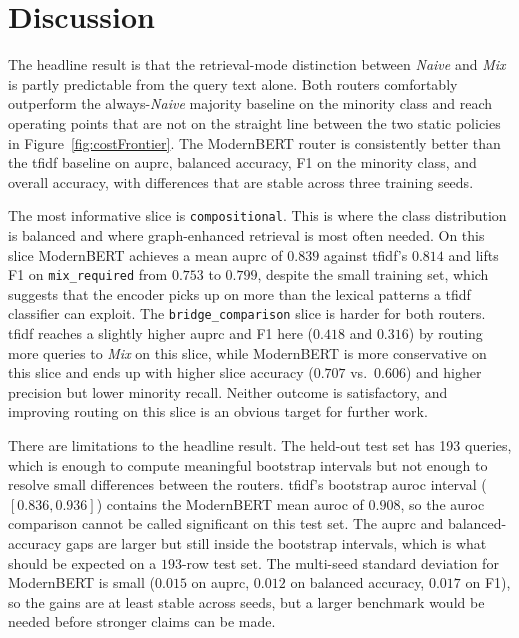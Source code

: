 \documentclass[english, bibtex]{kththesis}               %
\numberwithin{listing}{chapter}
\begin{document}
\section{Discussion}
\label{sec:implDiscussion}

The headline result is that the retrieval-mode distinction between \emph{Naive} and \emph{Mix} is partly predictable from the query text alone. Both routers comfortably outperform the always-\emph{Naive} majority baseline on the minority class and reach operating points that are not on the straight line between the two static policies in Figure~\ref{fig:costFrontier}. The ModernBERT router is consistently better than the \gls{tfidf} baseline on \gls{auprc}, balanced accuracy, F1 on the minority class, and overall accuracy, with differences that are stable across three training seeds.

The most informative slice is \texttt{compositional}. This is where the class distribution is balanced and where graph-enhanced retrieval is most often needed. On this slice ModernBERT achieves a mean \gls{auprc} of $0.839$ against \gls{tfidf}'s $0.814$ and lifts F1 on \texttt{mix\_required} from $0.753$ to $0.799$, despite the small training set, which suggests that the encoder picks up on more than the lexical patterns a \gls{tfidf} classifier can exploit. The \texttt{bridge\_comparison} slice is harder for both routers. \gls{tfidf} reaches a slightly higher \gls{auprc} and F1 here ($0.418$ and $0.316$) by routing more queries to \emph{Mix} on this slice, while ModernBERT is more conservative on this slice and ends up with higher slice accuracy ($0.707$ vs.\ $0.606$) and higher precision but lower minority recall. Neither outcome is satisfactory, and improving routing on this slice is an obvious target for further work.

There are limitations to the headline result. The held-out test set has 193 queries, which is enough to compute meaningful bootstrap intervals but not enough to resolve small differences between the routers. \gls{tfidf}'s bootstrap \gls{auroc} interval ($[0.836, 0.936]$) contains the ModernBERT mean \gls{auroc} of $0.908$, so the \gls{auroc} comparison cannot be called significant on this test set. The \gls{auprc} and balanced-accuracy gaps are larger but still inside the bootstrap intervals, which is what should be expected on a $193$-row test set. The multi-seed standard deviation for ModernBERT is small ($0.015$ on \gls{auprc}, $0.012$ on balanced accuracy, $0.017$ on F1), so the gains are at least stable across seeds, but a larger benchmark would be needed before stronger claims can be made.
\end{document}
